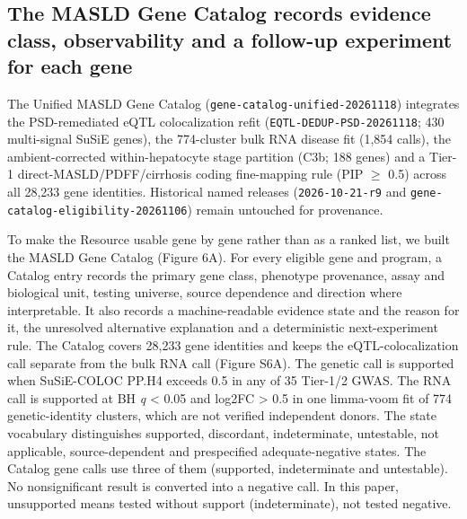 \subsection{The MASLD Gene Catalog records evidence class, observability and a follow-up experiment for each gene}\label{the-masld-gene-catalog-records-evidence-class-observability-and-a-follow-up-experiment-for-each-gene}

The Unified MASLD Gene Catalog (\texttt{gene-catalog-unified-20261118}) integrates the PSD-remediated eQTL colocalization refit (\texttt{EQTL-DEDUP-PSD-20261118}; 430 multi-signal SuSiE genes), the 774-cluster bulk RNA disease fit (1,854 calls), the ambient-corrected within-hepatocyte stage partition (C3b; 188 genes) and a Tier-1 direct-MASLD/PDFF/cirrhosis coding fine-mapping rule (PIP $\ge$ 0.5) across all 28,233 gene identities. Historical named releases (\texttt{2026-10-21-r9} and \texttt{gene-catalog-eligibility-20261106}) remain untouched for provenance.

To make the Resource usable gene by gene rather than as a ranked list, we built
the MASLD Gene Catalog (Figure 6A). For every eligible gene and program, a Catalog
entry records the primary gene class, phenotype provenance, assay and biological
unit, testing universe, source dependence and direction where interpretable. It
also records a machine-readable evidence state and the reason for it, the
unresolved alternative explanation and a deterministic next-experiment rule. The
Catalog covers 28,233 gene identities and keeps the eQTL-colocalization call
separate from the bulk RNA call (Figure S6A). The genetic call is supported when
SuSiE-COLOC PP.H4 exceeds 0.5 in any of 35 Tier-1/2 GWAS. The RNA call is
supported at BH \emph{q} \textless{} 0.05 and \textbar log2FC\textbar{} \textgreater{} 0.5 in one limma-voom fit of 774
genetic-identity clusters, which are not verified independent donors. The state
vocabulary distinguishes supported, discordant, indeterminate, untestable, not
applicable, source-dependent and prespecified adequate-negative states. The
Catalog gene calls use three of them (supported, indeterminate and untestable).
No nonsignificant result is converted into a negative call. In this paper,
unsupported means tested without support (indeterminate), not tested negative.

